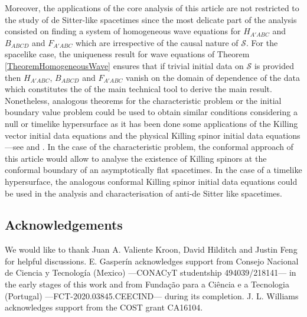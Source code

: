\documentclass[10pt,a4paper]{article}
\theoremstyle{plain}
\begin{document}
\medskip

Moreover, the applications of the core analysis of this article
are not restricted to the study of de Sitter-like spacetimes since the most delicate part of the analysis
consisted on finding a system of homogeneous wave equations for
$H_{A'ABC}$ and $B_{ABCD}$ and $F_{A'ABC}$ which are irrespective of
the causal nature of $\mathcal{S}$. For the spacelike case, the
uniqueness result for wave equations of Theorem
\ref{TheoremHomogeneousWave} ensures that if trivial initial data on
$\mathcal{S}$ is provided then $H_{A'ABC}$, $B_{ABCD}$ and $F_{A'ABC}$
vanish on the domain of dependence of the data which constitutes the
of the main technical tool to derive the main result.
Nonetheless, analogous theorems for the characteristic problem or
the initial boundary value problem could be used to obtain similar
conditions considering a null or timelike hypersurface as it has been done
some applications of the Killing vector initial data equations and the
physical Killing spinor initial data equations
---see \cite{Pae14a, ColRacVal18} and \cite{CarVal18}.
In the case of the characteristic problem, the conformal approach of
this article would allow to analyse the existence of Killing spinors
at the conformal boundary of an asymptotically flat spacetimes.  In the
case of a timelike hypersurface, the analogous conformal Killing
spinor initial data equations could be used in the analysis and
characterisation of anti-de Sitter like spacetimes.


\subsection*{Acknowledgements}

We would like to thank Juan A. Valiente Kroon, David Hilditch and Justin Feng for helpful discussions.
E. Gasper\'in acknowledges support from Consejo Nacional de
Ciencia y Tecnolog\'ia (Mexico) ---CONACyT studentship
494039/218141--- in the early stages of this work and from Fundaç\~ao
para a Ci\^encia e a Tecnologia (Portugal) ---FCT-2020.03845.CEECIND---
during its completion. J. L. Williams acknowledges support from the COST grant CA16104.  
\appendix
\end{document}
